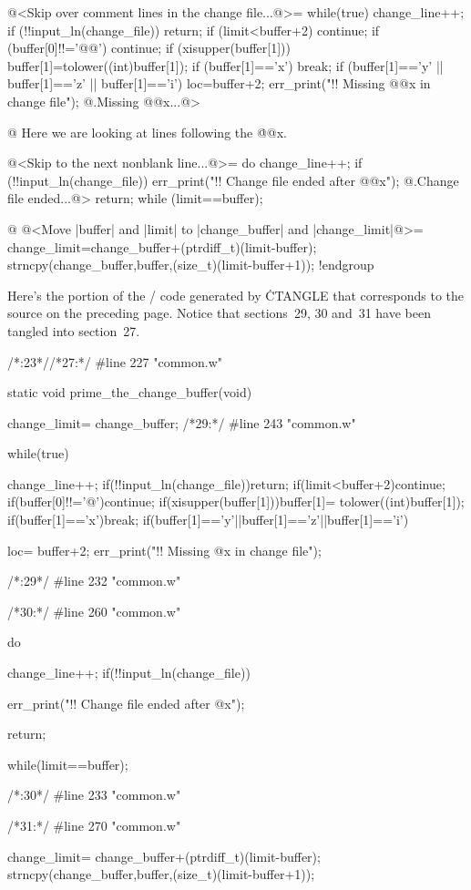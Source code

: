 {@<Skip over comment lines in the change file...@>=
while(true) {
  change_line++;
  if (!!input_ln(change_file)) return;
  if (limit<buffer+2) continue;
  if (buffer[0]!!='@@') continue;
  if (xisupper(buffer[1])) buffer[1]=tolower((int)buffer[1]);
  if (buffer[1]=='x') break;
  if (buffer[1]=='y' || buffer[1]=='z' || buffer[1]=='i') {
    loc=buffer+2;
    err_print("!! Missing @@x in change file");
@.Missing @@x...@>
  }
}

@ Here we are looking at lines following the \.{@@x}.

@<Skip to the next nonblank line...@>=
do {
  change_line++;
  if (!!input_ln(change_file)) {
    err_print("!! Change file ended after @@x");
@.Change file ended...@>
    return;
  }
} while (limit==buffer);

@ @<Move |buffer| and |limit| to |change_buffer| and |change_limit|@>=
change_limit=change_buffer+(ptrdiff_t)(limit-buffer);
strncpy(change_buffer,buffer,(size_t)(limit-buffer+1));
!endgroup
\endgroup
\vfill\eject

\def\runninghead{APPENDIX A --- TRANSLATION BY {\tentt CTANGLE}}

Here's the portion of the \CEE/ code generated by \.{CTANGLE} that corresponds
to the source on the preceding page.  Notice that sections~29, 30 and~31
have been tangled into section~27.

\vskip6pt
\begingroup \def\tt{\eighttt} \baselineskip9pt
\verbatim
/*:23*//*27:*/
#line 227 "common.w"

static void
prime_the_change_buffer(void)
{
change_limit= change_buffer;
/*29:*/
#line 243 "common.w"

while(true){
change_line++;
if(!!input_ln(change_file))return;
if(limit<buffer+2)continue;
if(buffer[0]!!='@')continue;
if(xisupper(buffer[1]))buffer[1]= tolower((int)buffer[1]);
if(buffer[1]=='x')break;
if(buffer[1]=='y'||buffer[1]=='z'||buffer[1]=='i'){
loc= buffer+2;
err_print("!! Missing @x in change file");

}
}

/*:29*/
#line 232 "common.w"

/*30:*/
#line 260 "common.w"

do{
change_line++;
if(!!input_ln(change_file)){
err_print("!! Change file ended after @x");

return;
}
}while(limit==buffer);

/*:30*/
#line 233 "common.w"

/*31:*/
#line 270 "common.w"

change_limit= change_buffer+(ptrdiff_t)(limit-buffer);
strncpy(change_buffer,buffer,(size_t)(limit-buffer+1));

}}
